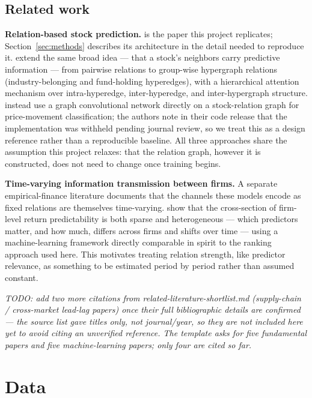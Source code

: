 \documentclass[12pt]{article}
\newcommand{\inst}[1]{\textit{#1}}
\begin{document}
\subsection{Related work}
\label{sec:related}

\textbf{Relation-based stock prediction.} \citet{feng2019temporal} is the paper this project
replicates; Section~\ref{sec:methods} describes its architecture in the detail needed to reproduce
it. \citet{cui2023temporal} extend the same broad idea --- that a stock's neighbors carry
predictive information --- from pairwise relations to group-wise hypergraph relations
(industry-belonging and fund-holding hyperedges), with a hierarchical attention mechanism over
intra-hyperedge, inter-hyperedge, and inter-hypergraph structure. \citet{jafari2022gcnet} instead
use a graph convolutional network directly on a stock-relation graph for price-movement
classification; the authors note in their code release that the implementation was withheld
pending journal review, so we treat this as a design reference rather than a reproducible
baseline. All three approaches share the assumption this project relaxes: that the relation graph,
however it is constructed, does not need to change once training begins.

\textbf{Time-varying information transmission between firms.} A separate empirical-finance
literature documents that the channels these models encode as fixed relations are themselves
time-varying. \citet{evgeniou2023uncovering} show that the cross-section of firm-level return
predictability is both sparse and heterogeneous --- which predictors matter, and how much, differs
across firms and shifts over time --- using a machine-learning framework directly comparable in
spirit to the ranking approach used here. This motivates treating relation strength, like
predictor relevance, as something to be estimated period by period rather than assumed constant.

\inst{TODO: add two more citations from related-literature-shortlist.md (supply-chain /
cross-market lead-lag papers) once their full bibliographic details are confirmed --- the
source list gave titles only, not journal/year, so they are not included here yet to avoid
citing an unverified reference. The template asks for five fundamental papers and five
machine-learning papers; only four are cited so far.}


\section{Data}
\label{sec:data}
\end{document}
